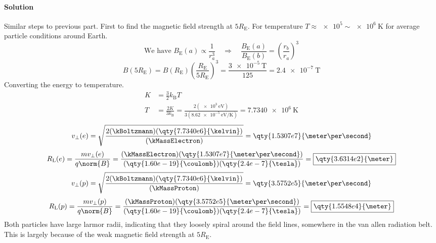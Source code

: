 \documentclass{article}
\begin{document}
\begin{enumerate}
		\paragraph{Solution} Similar steps to previous part. First to find the magnetic field strength at $5R_\mathrm{E}$. For temperature $T \approx \num{e5} \sim \qty{e6}{\kelvin}$ for average particle conditions around Earth. \\
		\[
			\text{We have } B_\mathrm{E}(a) \propto \frac{1}{r_a^3} \quad \Rightarrow \quad \frac{B_\mathrm{E}(a)}{B_\mathrm{E}(b)} = \left( \frac{r_b}{r_a} \right)^3
		\]
		\[
			B(5R_\mathrm{E}) = B(R_\mathrm{E}) \left( \frac{R_\mathrm{E}}{5R_\mathrm{E}} \right)^3 = \frac{\qty{3e-5}{\tesla}}{125} = \qty{2.4e-7}{\tesla}
		\]
		Converting the energy to temperature.
		\begin{equation*}
			\begin{split}
				K &= \frac{3}{2} k_\mathrm{B} T \\
				T &= \frac{2K}{3k_\mathrm{B}} = \frac{2(\qty{e3}{\electronvolt})}{3(\qty{8.62e-5}{\electronvolt\per\kelvin})} = \qty{7.7340e6}{\kelvin}
			\end{split}
		\end{equation*}
		\[
			v_\perp(e) = \sqrt{ \frac{2 (\kBoltzmann)(\qty{7.7340e6}{\kelvin})}{(\kMassElectron)} } = \qty{1.5307e7}{\meter\per\second}
		\]
		\[
			R_\mathrm{L}(e) = \frac{mv_\perp(e)}{q\norm{B}} = \frac{(\kMassElectron)(\qty{1.5307e7}{\meter\per\second})}{(\qty{1.60e-19}{\coulomb})(\qty{2.4e-7}{\tesla})} = \boxed{\qty{3.6314e2}{\meter}}
		\]
		\[
			v_\perp(p) = \sqrt{ \frac{2 (\kBoltzmann)(\qty{7.7340e6}{\kelvin})}{(\kMassProton)} } = \qty{3.5752e5}{\meter\per\second}
		\]
		\[
			R_\mathrm{L}(p) = \frac{mv_\perp(p)}{q\norm{B}} = \frac{(\kMassProton)(\qty{3.5752e5}{\meter\per\second})}{(\qty{1.60e-19}{\coulomb})(\qty{2.4e-7}{\tesla})} = \boxed{\qty{1.5548e4}{\meter}}
		\]
		Both particles have large larmor radii, indicating that they loosely spiral around the field lines, somewhere in the van allen radiation belt. This is largely because of the weak magnetic field strength at $5R_\mathrm{E}$.
		
		
		
	\end{enumerate}
	
	
\end{document}
